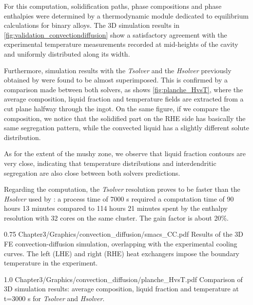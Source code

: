 For this computation, solidification paths, phase compositions and phase enthalpies were determined by a thermodynamic 
module dedicated to equilibrium calculations for binary alloys. 
The 3D simulation results in \cref{fig:validation_convectiondiffusion}
show a satisfactory agreement with the experimental temperature measurements recorded at mid-heights of the cavity and uniformly 
distributed along its width. 

Furthermore, simulation results with the \emph{Tsolver} and the \emph{Hsolver} 
previously obtained by \citet{carozzani_direct_2013} were 
found to be almost superimposed. This is confirmed by a comparison made 
between both solvers, as shows \cref{fig:planche_HvsT}, where the average composition, 
liquid fraction and temperature fields are extracted from a cut plane halfway through the ingot. 
On the same figure, if we compare the composition, we notice that the solidified part on the RHE 
side has basically the same segregation pattern, while the convected liquid has a slightly different 
solute distribution. 

As for the extent of the mushy zone, we observe that liquid
fraction contours are very close, indicating that temperature distributions and interdendritic segregation are also close between 
both solvers predictions. 

Regarding the computation, the \emph{Tsolver} resolution proves to be 
faster than the \emph{Hsolver} used by \citet{carozzani_direct_2013}: a process time of 7000 s required a computation time of 90 hours 
13 minutes compared to 114 hours 21 minutes spent by the enthalpy resolution with 32 cores on the same cluster. The gain factor 
is about 20\%.

\begin{figureth}
{0.75}
{Chapter3/Graphics/convection_diffusion/smacs_CC.pdf}
{Results of the 3D FE convection-diffusion simulation, overlapping with the experimental cooling curves.
The left (LHE) and right (RHE) heat exchangers impose the boundary temperature in the experiment.}
\label{fig:validation_convectiondiffusion}
\end{figureth}

\begin{figureth}
{1.0}
{Chapter3/Graphics/convection_diffusion/planche_HvsT.pdf}
{Comparison of 3D simulation results: average composition, liquid fraction and temperature at t=3000 s for \emph{Tsolver} and \emph{Hsolver}.}
\label{fig:planche_HvsT}
\end{figureth}

